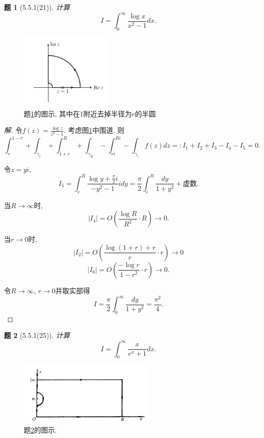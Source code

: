 \documentclass{article}[a4paper, 12pt]
\theoremstyle{mystyle}
\newtheorem{problem}{题}
\newenvironment{solution}{\begin{proof}[解]}{\end{proof}}
\begin{document}
\begin{problem}[5.5.1(21)]\label{21}
  计算\[I=\int_0^\infty \frac{\log x}{x^2-1}dx.\]
\end{problem}

\begin{figure}[htbp]
  \centering
  \includegraphics[width=0.4\textwidth]{images/21.png}
  \caption{题\ref{21}的图示, 其中在1附近去掉半径为\(r\)的半圆}
  \label{fig:21}
\end{figure}

\begin{solution}
  令\(f(z)=\frac{\log z}{z^2-1}\). 考虑图\ref{fig:21}中围道. 则\[\int_{r}^{1-r}+\int_{\gamma_1}+\int_{1+r}^R+\int_{\gamma_R}-\int_{ri}^{Ri}-\int_{\gamma_r} f(z)dz=:I_1+I_2+I_3-I_4-I_5=0.\]

  令\(z=yi\), \[I_5=\int_r^R\frac{\log y+\frac{\pi}{2}i}{-y^2-1}idy=\frac{\pi}{2}\int_r^R\frac{dy}{1+y^2}+\text{虚数}.\]

  当\(R\to\infty\)时, \[|I_4|=O\left(\frac{\log R}{R^2}\cdot R\right)\to0.\]

  当\(r\to0\)时, \[|I_2|=O\left(\frac{\log (1+r)+r}{r}\cdot r\right)\to0\] \[|I_6|=O\left(\frac{-\log r}{1-r^2}\cdot r\right)\to0.\]

  令\(R\to\infty\), \(r\to0\)并取实部得\[I=\frac{\pi}{2}\int_0^\infty\frac{dy}{1+y^2}=\frac{\pi^2}{4}.\tag*{\(\qed\)}\]
  \renewcommand{\qedsymbol}{}
\end{solution}

\begin{problem}[5.5.1(25)] \label{25}
  计算\[I=\int_0^\infty \frac{x}{e^x+1}dx.\]
\end{problem}

\begin{figure}[htbp]
  \centering
  \includegraphics[width=0.6\textwidth]{images/25.png}
  \caption{题\ref{25}的图示.}
  \label{fig:25}
\end{figure}
\end{document}
